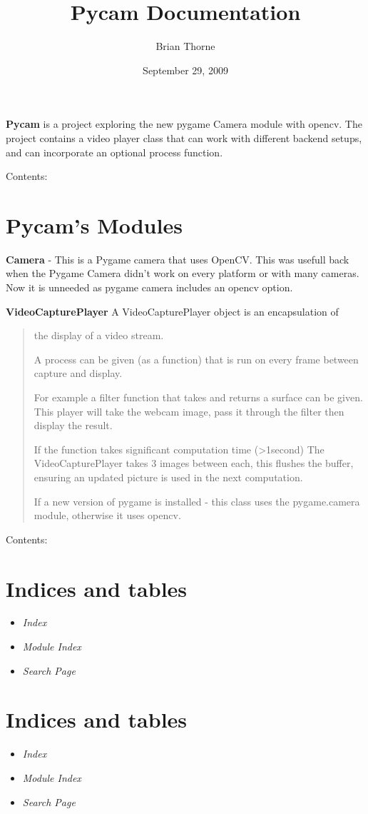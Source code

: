 \documentclass[letterpaper,10pt,english]{manual}
\title{Pycam Documentation}
\date{September 29, 2009}
\author{Brian Thorne}
\begin{document}
\maketitle
\tableofcontents
\hypertarget{--doc-index}{}


\textbf{Pycam} is a project exploring the new pygame Camera module with opencv. The project contains a video player class that can work with different backend setups, and can incorporate an optional process function.

Contents:

\resetcurrentobjects
\hypertarget{--doc-modules}{}

\chapter{Pycam's Modules}

\textbf{Camera} - This is a Pygame camera that uses OpenCV. This was usefull back when the Pygame Camera didn't work
on every platform or with many cameras. Now it is unneeded as pygame camera includes an opencv option.

\textbf{VideoCapturePlayer}
A VideoCapturePlayer object is an encapsulation of
\begin{quote}

the display of a video stream.

A process can be given (as a function) that is run
on every frame between capture and display.

For example a filter function that takes and returns a
surface can be given. This player will take the webcam image,
pass it through the filter then display the result.

If the function takes significant computation time (\textgreater{}1second)
The VideoCapturePlayer takes 3 images between each, this flushes
the buffer, ensuring an updated picture is used in the next computation.

If a new version of pygame is installed - this class uses the pygame.camera module, otherwise
it uses opencv.
\end{quote}

Contents:


\chapter{Indices and tables}
\begin{itemize}
\item {} 
\emph{Index}

\item {} 
\emph{Module Index}

\item {} 
\emph{Search Page}

\end{itemize}


\chapter{Indices and tables}
\begin{itemize}
\item {} 
\emph{Index}

\item {} 
\emph{Module Index}

\item {} 
\emph{Search Page}

\end{itemize}


\renewcommand{\indexname}{Module Index}
\printmodindex
\renewcommand{\indexname}{Index}
\printindex
\end{document}
